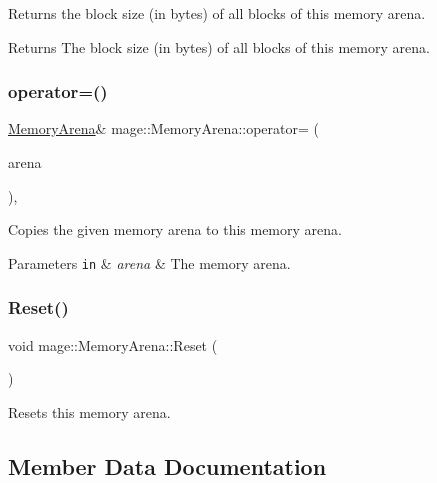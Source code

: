 Returns the block size (in bytes) of all blocks of this memory arena.

\begin{DoxyReturn}{Returns}
The block size (in bytes) of all blocks of this memory arena. 
\end{DoxyReturn}
\hypertarget{classmage_1_1_memory_arena_a7e7799f859c55435714933972ecb8b95}{}\label{classmage_1_1_memory_arena_a7e7799f859c55435714933972ecb8b95} 
\subsubsection{\texorpdfstring{operator=()}{operator=()}}
{\footnotesize\ttfamily \hyperlink{classmage_1_1_memory_arena}{Memory\+Arena}\& mage\+::\+Memory\+Arena\+::operator= (\begin{DoxyParamCaption}\item[{const \hyperlink{classmage_1_1_memory_arena}{Memory\+Arena} \&}]{arena }\end{DoxyParamCaption})\hspace{0.3cm}{\ttfamily [protected]}, {\ttfamily [delete]}}

Copies the given memory arena to this memory arena.


\begin{DoxyParams}[1]{Parameters}
\mbox{\tt in}  & {\em arena} & The memory arena. \\
\hline
\end{DoxyParams}
\hypertarget{classmage_1_1_memory_arena_a117b74c7bd5dfb28dfdaae6cab253491}{}\label{classmage_1_1_memory_arena_a117b74c7bd5dfb28dfdaae6cab253491} 
\subsubsection{\texorpdfstring{Reset()}{Reset()}}
{\footnotesize\ttfamily void mage\+::\+Memory\+Arena\+::\+Reset (\begin{DoxyParamCaption}{ }\end{DoxyParamCaption})}

Resets this memory arena. 

\subsection{Member Data Documentation}
\hypertarget{classmage_1_1_memory_arena_a89c4f1d2b4d5e05bb46fa303d70428c4}{}\label{classmage_1_1_memory_arena_a89c4f1d2b4d5e05bb46fa303d70428c4} 

